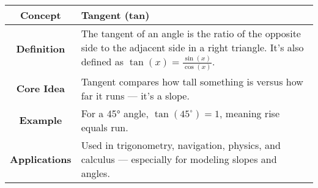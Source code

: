 \begin{NxLightBox}[title={Tangent Function}]
    \begingroup
    \renewcommand{\arraystretch}{1.8}
    \begin{tabularx}{\linewidth}{|c|X|}
        \hline
        \textbf{Concept} & Tangent (tan) \\
        \hline
        \textbf{Definition} & The tangent of an angle is the ratio of the opposite side to the adjacent side in a right triangle. It’s also defined as \( \tan(x) = \frac{\sin(x)}{\cos(x)} \). \\
        \hline
        \textbf{Core Idea} & Tangent compares how tall something is versus how far it runs — it’s a slope. \\
        \hline
        \textbf{Example} & For a 45° angle, \( \tan(45^\circ) = 1 \), meaning rise equals run. \\
        \hline
        \textbf{Applications} & Used in trigonometry, navigation, physics, and calculus — especially for modeling slopes and angles. \\
        \hline
    \end{tabularx}
    \endgroup
\end{NxLightBox}

